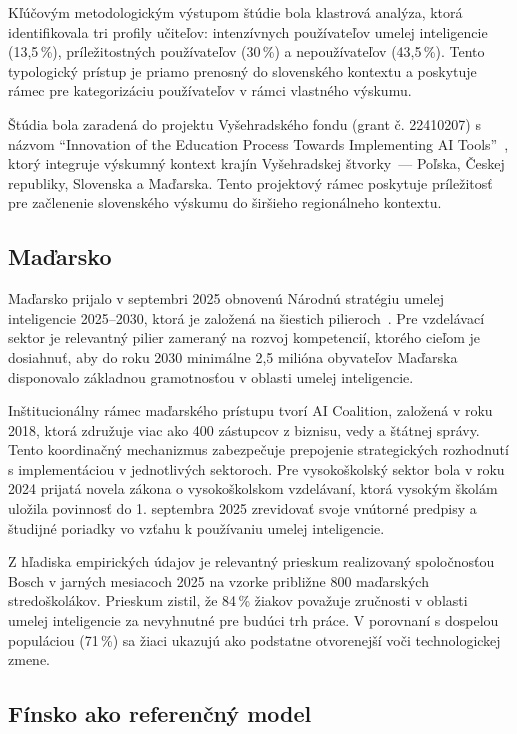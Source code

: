 Kľúčovým metodologickým výstupom štúdie bola klastrová analýza, ktorá identifikovala tri profily učiteľov: intenzívnych používateľov umelej inteligencie (13,5\,\%), príležitostných používateľov (30\,\%) a nepoužívateľov (43,5\,\%). Tento typologický prístup je priamo prenosný do slovenského kontextu a poskytuje rámec pre kategorizáciu používateľov v rámci vlastného výskumu.

Štúdia bola zaradená do projektu Vyšehradského fondu (grant č. 22410207) s názvom \enquote{Innovation of the Education Process Towards Implementing AI Tools}~\cite{v4ai}, ktorý integruje výskumný kontext krajín Vyšehradskej štvorky~--- Poľska, Českej republiky, Slovenska a Maďarska. Tento projektový rámec poskytuje príležitosť pre začlenenie slovenského výskumu do širšieho regionálneho kontextu.


\subsection{Maďarsko}

Maďarsko prijalo v septembri 2025 obnovenú Národnú stratégiu umelej inteligencie 2025--2030, ktorá je založená na šiestich pilieroch~\cite{hungary2025strategy}. Pre vzdelávací sektor je relevantný pilier zameraný na rozvoj kompetencií, ktorého cieľom je dosiahnuť, aby do roku 2030 minimálne 2,5 milióna obyvateľov Maďarska disponovalo základnou gramotnosťou v oblasti umelej inteligencie.

Inštitucionálny rámec maďarského prístupu tvorí AI Coalition, založená v roku 2018, ktorá združuje viac ako 400 zástupcov z biznisu, vedy a štátnej správy. Tento koordinačný mechanizmus zabezpečuje prepojenie strategických rozhodnutí s implementáciou v jednotlivých sektoroch. Pre vysokoškolský sektor bola v roku 2024 prijatá novela zákona o vysokoškolskom vzdelávaní, ktorá vysokým školám uložila povinnosť do 1. septembra 2025 zrevidovať svoje vnútorné predpisy a študijné poriadky vo vzťahu k používaniu umelej inteligencie.

Z hľadiska empirických údajov je relevantný prieskum realizovaný spoločnosťou Bosch v jarných mesiacoch 2025 na vzorke približne 800 maďarských stredoškolákov. Prieskum zistil, že 84\,\% žiakov považuje zručnosti v oblasti umelej inteligencie za nevyhnutné pre budúci trh práce. V porovnaní s dospelou populáciou (71\,\%) sa žiaci ukazujú ako podstatne otvorenejší voči technologickej zmene.


\subsection{Fínsko ako referenčný model}

